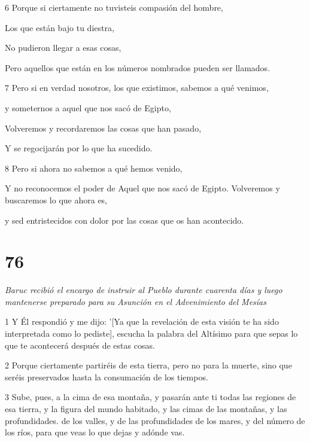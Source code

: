 \par 6 Porque si ciertamente no tuvisteis compasión del hombre,

\par Los que están bajo tu diestra,

\par No pudieron llegar a esas cosas,

\par Pero aquellos que están en los números nombrados pueden ser llamados.

\par 7 Pero si en verdad nosotros, los que existimos, sabemos a qué venimos,

y someternos a aquel que nos sacó de Egipto,

\par Volveremos y recordaremos las cosas que han pasado,

\par Y se regocijarán por lo que ha sucedido.

\par 8 Pero si ahora no sabemos a qué hemos venido,

Y no reconocemos el poder de Aquel que nos sacó de Egipto. Volveremos y buscaremos lo que ahora es,

y sed entristecidos con dolor por las cosas que os han acontecido.

\chapter{76}

\par \textit{Baruc recibió el encargo de instruir al Pueblo durante cuarenta días y luego mantenerse preparado para su Asunción en el Advenimiento del Mesías}

\par 1 Y Él respondió y me dijo: '[Ya que la revelación de esta visión te ha sido interpretada como lo pediste], escucha la palabra del Altísimo para que sepas lo que te acontecerá después de estas cosas.

\par 2 Porque ciertamente partiréis de esta tierra, pero no para la muerte, sino que seréis preservados hasta la consumación de los tiempos.

\par 3 Sube, pues, a la cima de esa montaña, y pasarán ante ti todas las regiones de esa tierra, y la figura del mundo habitado, y las cimas de las montañas, y las profundidades. de los valles, y de las profundidades de los mares, y del número de los ríos, para que veas lo que dejas y adónde vas.

